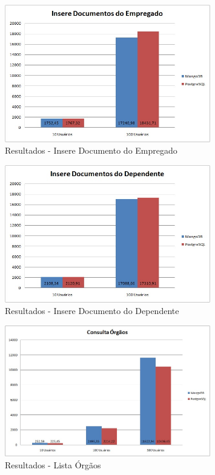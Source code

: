 \begin{figure}[!htbp]
	\begin{center}
		\includegraphics[width=0.8\textwidth]{resultados/insere_doc_empregado}
	\end{center}
	\caption{Resultados - Insere Documento do Empregado}
	\label{fig:resultinseredocempregado}
\end{figure}


\begin{figure}[!htbp]
	\begin{center}
		\includegraphics[width=0.8\textwidth]{resultados/insere_doc_dependentes}
	\end{center}
	\caption{Resultados - Insere Documento do Dependente}
	\label{fig:resultinseredocdependente}
\end{figure}

\begin{figure}[!htbp]
	\begin{center}
		\includegraphics[width=0.8\textwidth]{resultados/consulta_orgaos}
	\end{center}
	\caption{Resultados - Lista Órgãos}
	\label{fig:resultlistaorgaos}
\end{figure}

